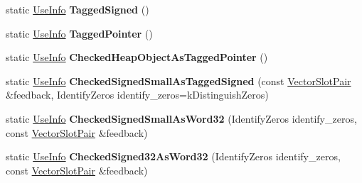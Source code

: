 \begin{DoxyCompactItemize}
\item 
\mbox{\label{classv8_1_1internal_1_1compiler_1_1UseInfo_a655d7475ccc2b8a8b97e436fcbf1409a}} 
static \mbox{\hyperlink{classv8_1_1internal_1_1compiler_1_1UseInfo}{Use\+Info}} {\bfseries Tagged\+Signed} ()
\item 
\mbox{\label{classv8_1_1internal_1_1compiler_1_1UseInfo_a1ccbd769077117f81d93016ebc0b0a7d}} 
static \mbox{\hyperlink{classv8_1_1internal_1_1compiler_1_1UseInfo}{Use\+Info}} {\bfseries Tagged\+Pointer} ()
\item 
\mbox{\label{classv8_1_1internal_1_1compiler_1_1UseInfo_a570cc85f691fe178f7449cc1202e99da}} 
static \mbox{\hyperlink{classv8_1_1internal_1_1compiler_1_1UseInfo}{Use\+Info}} {\bfseries Checked\+Heap\+Object\+As\+Tagged\+Pointer} ()
\item 
\mbox{\label{classv8_1_1internal_1_1compiler_1_1UseInfo_a9f8cee6cfa42e11ce44faeee20a0638b}} 
static \mbox{\hyperlink{classv8_1_1internal_1_1compiler_1_1UseInfo}{Use\+Info}} {\bfseries Checked\+Signed\+Small\+As\+Tagged\+Signed} (const \mbox{\hyperlink{classv8_1_1internal_1_1VectorSlotPair}{Vector\+Slot\+Pair}} \&feedback, Identify\+Zeros identify\+\_\+zeros=k\+Distinguish\+Zeros)
\item 
\mbox{\label{classv8_1_1internal_1_1compiler_1_1UseInfo_a0f509e0d9b064b32c299fc7be81f7ccd}} 
static \mbox{\hyperlink{classv8_1_1internal_1_1compiler_1_1UseInfo}{Use\+Info}} {\bfseries Checked\+Signed\+Small\+As\+Word32} (Identify\+Zeros identify\+\_\+zeros, const \mbox{\hyperlink{classv8_1_1internal_1_1VectorSlotPair}{Vector\+Slot\+Pair}} \&feedback)
\item 
\mbox{\label{classv8_1_1internal_1_1compiler_1_1UseInfo_ab69a92dc0b41825f9af8c2ef509e53b8}} 
static \mbox{\hyperlink{classv8_1_1internal_1_1compiler_1_1UseInfo}{Use\+Info}} {\bfseries Checked\+Signed32\+As\+Word32} (Identify\+Zeros identify\+\_\+zeros, const \mbox{\hyperlink{classv8_1_1internal_1_1VectorSlotPair}{Vector\+Slot\+Pair}} \&feedback)
\item 
\mbox{\label{classv8_1_1internal_1_1compiler_1_1UseInfo_a2414928695b7656ba1a2fea4609f37de}} 

\end{DoxyCompactItemize}
